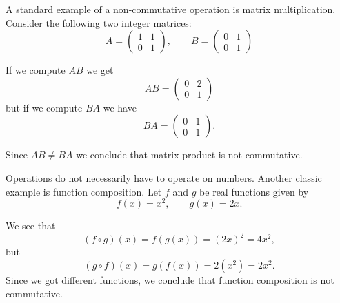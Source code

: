 \documentclass[12pt]{article}
\begin{document}
A standard example of a non-commutative operation is matrix multiplication. Consider the following two integer matrices:
\[
A=\begin{pmatrix}
1 & 1\\
0&1
\end{pmatrix},\qquad
B=\begin{pmatrix}
0 & 1\\
0 & 1
\end{pmatrix}
\]

If we compute $AB$ we get 
\[
AB=\begin{pmatrix}
0 & 2 \\
0 & 1
\end{pmatrix}
\]
but if we compute $BA$ we have
\[
BA=\begin{pmatrix}
0 & 1 \\
0 & 1
\end{pmatrix}.
\]

Since $AB\neq BA$ we conclude that matrix product is not commutative.

Operations do not necessarily have to operate on numbers. Another classic example is function composition. Let $f$ and $g$ be real functions given by
\[
f(x) = x^2,\qquad g(x) = 2x.
\]

We see that
\[
(f\circ g)(x) = f(g(x)) = (2x)^2 = 4x^2,
\]
but 
\[
(g \circ f )(x) = g(f(x)) = 2(x^2) = 2x^2.
\]
Since we got different functions, we conclude that function composition is not commutative.
\end{document}
